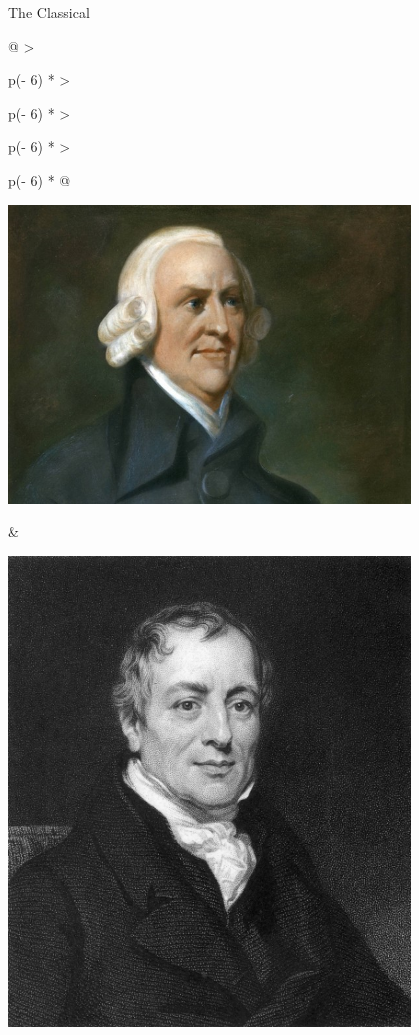 \begin{frame}{The Classical}
\protect\hypertarget{the-classical}{}


\begin{longtable}[]{@{}
  >{\raggedright\arraybackslash}p{(\columnwidth - 6\tabcolsep) * }
  >{\raggedright\arraybackslash}p{(\columnwidth - 6\tabcolsep) * }
  >{\raggedright\arraybackslash}p{(\columnwidth - 6\tabcolsep) * }
  >{\raggedright\arraybackslash}p{(\columnwidth - 6\tabcolsep) * }@{}}
\toprule\noalign{}
\begin{minipage}[b]{\linewidth}\raggedright
\includegraphics[width=0.8\textwidth,height=\textheight]{assets/adam_smith.jpg}
\end{minipage} & \begin{minipage}[b]{\linewidth}\raggedright
\includegraphics[width=0.8\textwidth,height=\textheight]{assets/ricardo.jpeg}

\end{minipage}
\end{longtable}
\end{frame}
